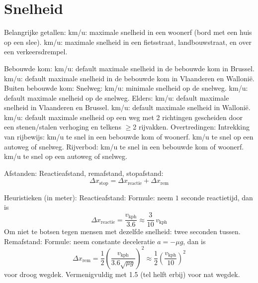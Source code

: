 \section{Snelheid}
\begin{outline}
\1 Belangrijke getallen:
	 km/u: maximale snelheid in een woonerf (bord met een huis op een slee).
	 km/u: maximale snelheid in een fietsstraat, landbouwstraat, en over een verkeersdrempel.
	
\newpage
	
	\2 Bebouwde kom:
		 km/u: default maximale snelheid in de bebouwde kom in Brussel.
		 km/u: default maximale snelheid in de bebouwde kom in Vlaanderen en Wallonië.
	\2 Buiten bebouwde kom:
		\3 Snelweg:
			 km/u: minimale snelheid op de snelweg.
			 km/u: default maximale snelheid op de snelweg.
		\3 Elders:
			 km/u: default maximale snelheid in Vlaanderen en Brussel.
			 km/u: default maximale snelheid in Wallonië.
			 km/u: default maximale snelheid op een weg met 2 richtingen gescheiden door een stenen/stalen verhoging en telkens $\geq$2 rijvakken.
	\2 Overtredingen:
		\3 Intrekking van rijbewijs:
			 km/u te snel in een bebouwde kom of woonerf.
			 km/u te snel op een autoweg of snelweg.
		\3 Rijverbod:
			 km/u te snel in een bebouwde kom of woonerf.
			 km/u te snel op een autoweg of snelweg.

\1 Afstanden:
	\2 Reactieafstand, remafstand, stopafstand:
	\begin{equation}
		\Delta x_\textrm{stop} = \Delta x_\textrm{reactie} + \Delta x_\textrm{rem}
	\end{equation}
	
	\2 Heuristieken (in meter):
		\3 Reactieafstand:
			\4 Formule: neem $1$ seconde reactietijd, dan is
			\begin{equation}
				\Delta x_\textrm{reactie} = \frac{v_\textrm{kph}}{3.6} \approx \frac{3}{10}\, v_\textrm{kph}
			\end{equation}
			\4 Om niet te botsen tegen mensen met dezelfde snelheid: twee seconden tussen.
		\3 Remafstand:
			\4 Formule: neem constante deceleratie $a = -\mu g$, dan is
			\begin{equation}
				\Delta x_\textrm{rem} = \frac{1}{2} \left( \frac{v_\textrm{kph}}{3.6 \sqrt{\mu g}} \right)^{\!2} \approx \frac{1}{2} \left( \frac{v_\textrm{kph}}{10} \right)^{\!2}
			\end{equation}
			voor droog wegdek. Vermenigvuldig met 1.5 (tel helft erbij) voor nat wegdek.


\end{outline}
